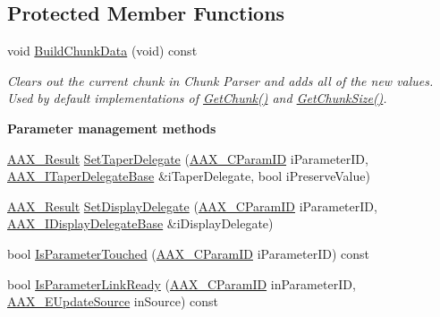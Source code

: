 \subsection*{Protected Member Functions}
\begin{DoxyCompactItemize}
\item 
void \hyperlink{a00018_a190f0573f8959ac5397565e198c485d4}{Build\+Chunk\+Data} (void) const 
\begin{DoxyCompactList}\small\item\em Clears out the current chunk in Chunk Parser and adds all of the new values. Used by default implementations of \hyperlink{a00018_a2526332264a5a0c7b06ecf76e58a67d9}{Get\+Chunk()} and \hyperlink{a00018_a9e4afba12f3e778a91f9afec9ef44c78}{Get\+Chunk\+Size()}. \end{DoxyCompactList}\end{DoxyCompactItemize}
\begin{Indent}{\bf Parameter management methods}\par
\begin{DoxyCompactItemize}
\item 
\hyperlink{a00149_a4d8f69a697df7f70c3a8e9b8ee130d2f}{A\+A\+X\+\_\+\+Result} \hyperlink{a00018_a363be3503435a8619f6cba787ee678ac}{Set\+Taper\+Delegate} (\hyperlink{a00149_a1440c756fe5cb158b78193b2fc1780d1}{A\+A\+X\+\_\+\+C\+Param\+I\+D} i\+Parameter\+I\+D, \hyperlink{a00115}{A\+A\+X\+\_\+\+I\+Taper\+Delegate\+Base} \&i\+Taper\+Delegate, bool i\+Preserve\+Value)
\item 
\hyperlink{a00149_a4d8f69a697df7f70c3a8e9b8ee130d2f}{A\+A\+X\+\_\+\+Result} \hyperlink{a00018_ad4aeb081bffb2414182251d4e41c1ed2}{Set\+Display\+Delegate} (\hyperlink{a00149_a1440c756fe5cb158b78193b2fc1780d1}{A\+A\+X\+\_\+\+C\+Param\+I\+D} i\+Parameter\+I\+D, \hyperlink{a00093}{A\+A\+X\+\_\+\+I\+Display\+Delegate\+Base} \&i\+Display\+Delegate)
\item 
bool \hyperlink{a00018_af5445bb9f40ccf826227199647e140ee}{Is\+Parameter\+Touched} (\hyperlink{a00149_a1440c756fe5cb158b78193b2fc1780d1}{A\+A\+X\+\_\+\+C\+Param\+I\+D} i\+Parameter\+I\+D) const 
\item 
bool \hyperlink{a00018_ae105f2a8a00facc2a190ef3ea86c5328}{Is\+Parameter\+Link\+Ready} (\hyperlink{a00149_a1440c756fe5cb158b78193b2fc1780d1}{A\+A\+X\+\_\+\+C\+Param\+I\+D} in\+Parameter\+I\+D, \hyperlink{a00206_a30be0398faf20c6b121239eb9399f3f7}{A\+A\+X\+\_\+\+E\+Update\+Source} in\+Source) const 
\end{DoxyCompactItemize}
\end{Indent}
